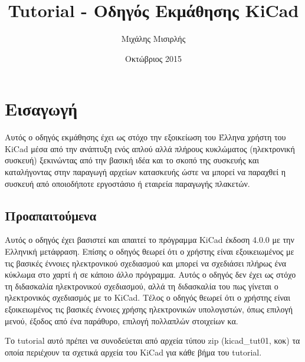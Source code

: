 \documentclass[a4paper]{article}
\title{Tutorial - Οδηγός Εκμάθησης KiCad}
\author{Μιχάλης Μισιρλής}
\date{Οκτώβριος 2015}
\begin{document}
\maketitle

\pagebreak
\tableofcontents
\pagebreak

\section{Εισαγωγή}
Αυτός ο οδηγός εκμάθησης έχει ως στόχο την εξοικείωση του Έλληνα χρήστη του \textenglish{KiCad} μέσα από την ανάπτυξη ενός απλού αλλά πλήρους κυκλώματος (ηλεκτρονική συσκευή) ξεκινώντας από την βασική ιδέα και το σκοπό της συσκευής και καταλήγοντας στην παραγωγή αρχείων κατασκευής ώστε να μπορεί να παραχθεί η συσκευή από οποιοδήποτε εργοστάσιο ή εταιρεία παραγωγής πλακετών.

\subsection{Προαπαιτούμενα}
\label{sec:prereq}
Αυτός ο οδηγός έχει βασιστεί και απαιτεί το πρόγραμμα \textenglish{KiCad} έκδοση 4.0.0 με την Ελληνική μετάφραση. Επίσης ο οδηγός θεωρεί ότι ο χρήστης είναι εξοικειωμένος με τις βασικές έννοιες ηλεκτρονικού σχεδιασμού και μπορεί να σχεδιάσει πλήρως ένα κύκλωμα στο χαρτί ή σε κάποιο άλλο πρόγραμμα. Αυτός ο οδηγός δεν έχει ως στόχο τη διδασκαλία ηλεκτρονικού σχεδιασμού, αλλά τη διδασκαλία του πως γίνεται ο ηλεκτρονικός σχεδιασμός με το \textenglish{KiCad}.
Τέλος ο οδηγός θεωρεί ότι ο χρήστης είναι εξοικειωμένος τις βασικές έννοιες χρήσης ηλεκτρονικών υπολογιστών, όπως επιλογή μενού, έξοδος από ένα παράθυρο, επιλογή πολλαπλών στοιχείων κα.

Το tutorial αυτό πρέπει να συνοδεύεται από αρχεία τύπου zip (kicad\_tut01, κοκ) τα οποία περιέχουν τα σχετικά αρχεία του \textenglish{KiCad} για κάθε βήμα του tutorial.
\end{document}
